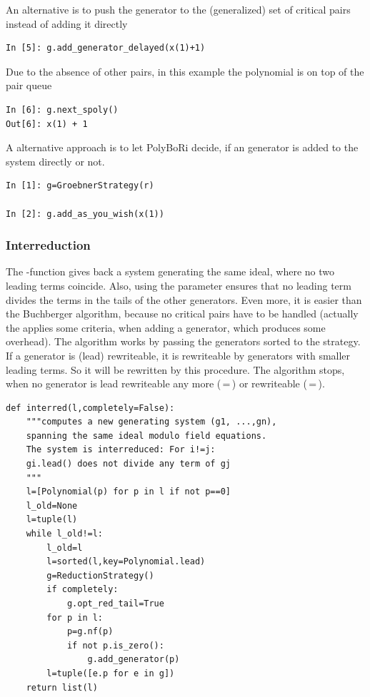 An alternative is to push the generator to the (generalized) set of critical pairs instead of adding it directly
\begin{lstlisting}
In [5]: g.add_generator_delayed(x(1)+1)
\end{lstlisting}
Due to the absence of other pairs, in this example the polynomial is on top of the pair queue
\begin{lstlisting}
In [6]: g.next_spoly()
Out[6]: x(1) + 1
\end{lstlisting}

A alternative approach is to let PolyBoRi decide, if an generator is added to the system directly or not.
\begin{lstlisting}
In [1]: g=GroebnerStrategy(r)

In [2]: g.add_as_you_wish(x(1))
\end{lstlisting}

\subsubsection{Interreduction}
The -function gives back a system generating the same ideal, where no two leading terms coincide.
Also, using the parameter  ensures that no leading term divides the terms in the tails of the other generators.
Even more, it is easier than the Buchberger algorithm, because no critical pairs have to be handled (actually the  applies some criteria, when adding a generator, which produces some overhead).
The algorithm works by passing the generators sorted to the strategy. If a generator is (lead) rewriteable, it is rewriteable by generators with smaller leading terms.
So it will be rewritten by this procedure.
The algorithm stops, when no generator is lead rewriteable any more (\,=\,) or rewriteable (\,=\,).
\begin{lstlisting}
def interred(l,completely=False):
    """computes a new generating system (g1, ...,gn), 
    spanning the same ideal modulo field equations.
    The system is interreduced: For i!=j: 
    gi.lead() does not divide any term of gj
    """
    l=[Polynomial(p) for p in l if not p==0]
    l_old=None
    l=tuple(l)
    while l_old!=l:
        l_old=l
        l=sorted(l,key=Polynomial.lead)
        g=ReductionStrategy()
        if completely:
            g.opt_red_tail=True
        for p in l:
            p=g.nf(p)
            if not p.is_zero():
                g.add_generator(p)
        l=tuple([e.p for e in g])
    return list(l)
\end{lstlisting}

